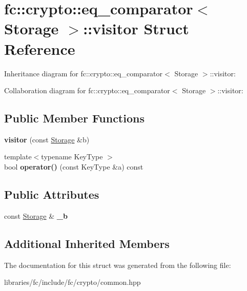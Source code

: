 \hypertarget{structfc_1_1crypto_1_1eq__comparator_1_1visitor}{}\section{fc\+:\+:crypto\+:\+:eq\+\_\+comparator$<$ Storage $>$\+:\+:visitor Struct Reference}
\label{structfc_1_1crypto_1_1eq__comparator_1_1visitor}


Inheritance diagram for fc\+:\+:crypto\+:\+:eq\+\_\+comparator$<$ Storage $>$\+:\+:visitor\+:


Collaboration diagram for fc\+:\+:crypto\+:\+:eq\+\_\+comparator$<$ Storage $>$\+:\+:visitor\+:
\subsection*{Public Member Functions}
\begin{DoxyCompactItemize}
\item 
\mbox{\label{structfc_1_1crypto_1_1eq__comparator_1_1visitor_ab56bc2223f7af1c19c447ae9aefdf4d5}} 
{\bfseries visitor} (const \mbox{\hyperlink{struct_storage}{Storage}} \&b)
\item 
\mbox{\label{structfc_1_1crypto_1_1eq__comparator_1_1visitor_ac3199ceb7b784cf005295f5bcc7da320}} 
{\footnotesize template$<$typename Key\+Type $>$ }\\bool {\bfseries operator()} (const Key\+Type \&a) const
\end{DoxyCompactItemize}
\subsection*{Public Attributes}
\begin{DoxyCompactItemize}
\item 
\mbox{\label{structfc_1_1crypto_1_1eq__comparator_1_1visitor_a11d2cc7231fe836743e1cf0e0f3374f1}} 
const \mbox{\hyperlink{struct_storage}{Storage}} \& {\bfseries \+\_\+b}
\end{DoxyCompactItemize}
\subsection*{Additional Inherited Members}


The documentation for this struct was generated from the following file\+:\begin{DoxyCompactItemize}
\item 
libraries/fc/include/fc/crypto/common.\+hpp\end{DoxyCompactItemize}
